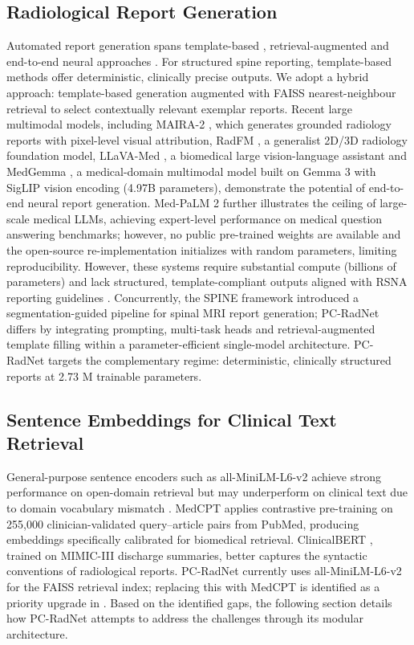 \documentclass[journal]{IEEEtran}
\newcommand{\modelname}{PC-RadNet}
\begin{document}
\subsection{Radiological Report Generation}
Automated report generation spans template-based \cite{li2018hybrid}, retrieval-augmented \cite{chen2023ptunifier} and end-to-end neural approaches \cite{chen2020generating}. For structured spine reporting, template-based methods offer deterministic, clinically precise outputs. We adopt a hybrid approach: template-based generation augmented with FAISS \cite{johnson2019billion} nearest-neighbour retrieval to select contextually relevant exemplar reports. Recent large multimodal models, including MAIRA-2 \cite{bannur2024maira2}, which generates grounded radiology reports with pixel-level visual attribution, RadFM \cite{wu2025radfm}, a generalist 2D/3D radiology foundation model, LLaVA-Med \cite{li2023llava_med}, a biomedical large vision-language assistant and MedGemma \cite{medgemma2025}, a medical-domain multimodal model built on Gemma 3 with SigLIP vision encoding (4.97B parameters), demonstrate the potential of end-to-end neural report generation. Med-PaLM 2 \cite{singhal2023medpalm2} further illustrates the ceiling of large-scale medical LLMs, achieving expert-level performance on medical question answering benchmarks; however, no public pre-trained weights are available and the open-source re-implementation initializes with random parameters, limiting reproducibility. However, these systems require substantial compute (billions of parameters) and lack structured, template-compliant outputs aligned with RSNA reporting guidelines \cite{rsna2024templates}. Concurrently, the SPINE framework \cite{spine_framework_2026} introduced a segmentation-guided pipeline for spinal MRI report generation; \modelname{} differs by integrating prompting, multi-task heads and retrieval-augmented template filling within a parameter-efficient single-model architecture. \modelname{} targets the complementary regime: deterministic, clinically structured reports at 2.73 M trainable parameters.

\subsection{Sentence Embeddings for Clinical Text Retrieval}
General-purpose sentence encoders such as all-MiniLM-L6-v2 \cite{wang2020minilm} achieve strong performance on open-domain retrieval but may underperform on clinical text due to domain vocabulary mismatch \cite{jin2023medcpt}. MedCPT \cite{jin2023medcpt} applies contrastive pre-training on 255,000 clinician-validated query--article pairs from PubMed, producing embeddings specifically calibrated for biomedical retrieval. ClinicalBERT \cite{alsentzer2019clinicalbert}, trained on MIMIC-III discharge summaries, better captures the syntactic conventions of radiological reports. \modelname{} currently uses all-MiniLM-L6-v2 for the FAISS retrieval index; replacing this with MedCPT is identified as a priority upgrade in . Based on the identified gaps, the following section details how \modelname{} attempts to address the challenges through its modular architecture.
\end{document}

